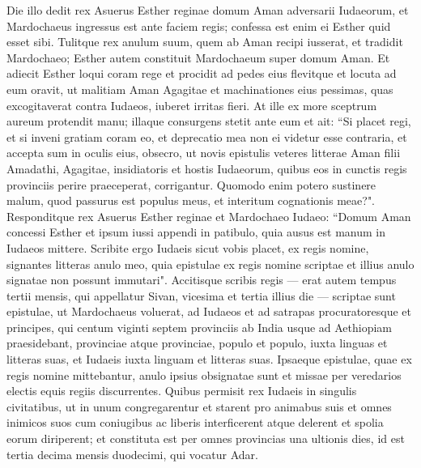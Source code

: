 \begin{biblechapter} 
\verse Die illo dedit rex Asuerus Esther reginae domum Aman adversarii Iudaeorum, et Mardochaeus ingressus est ante faciem regis; confessa est enim ei Esther quid esset sibi. 
\verse Tulitque rex anulum suum, quem ab Aman recipi iusserat, et tradidit Mardochaeo; Esther autem constituit Mardochaeum super domum Aman. 
\verse Et adiecit Esther loqui coram rege et procidit ad pedes eius flevitque et locuta ad eum oravit, ut malitiam Aman Agagitae et machinationes eius pessimas, quas excogitaverat contra Iudaeos, iuberet irritas fieri. 
\verse At ille ex more sceptrum aureum protendit manu; illaque consurgens stetit ante eum 
\verse et ait: “Si placet regi, et si inveni gratiam coram eo, et deprecatio mea non ei videtur esse contraria, et accepta sum in oculis eius, obsecro, ut novis epistulis veteres litterae Aman filii Amadathi, Agagitae, insidiatoris et hostis Iudaeorum, quibus eos in cunctis regis provinciis perire praeceperat, corrigantur. 
\verse Quomodo enim potero sustinere malum, quod passurus est populus meus, et interitum cognationis meae?". 
\verse Responditque rex Asuerus Esther reginae et Mardochaeo Iudaeo: “Domum Aman concessi Esther et ipsum iussi appendi in patibulo, quia ausus est manum in Iudaeos mittere. 
\verse Scribite ergo Iudaeis sicut vobis placet, ex regis nomine, signantes litteras anulo meo, quia epistulae ex regis nomine scriptae et illius anulo signatae non possunt immutari". 
\verse Accitisque scribis regis — erat autem tempus tertii mensis, qui appellatur Sivan, vicesima et tertia illius die — scriptae sunt epistulae, ut Mardochaeus voluerat, ad Iudaeos et ad satrapas procuratoresque et principes, qui centum viginti septem provinciis ab India usque ad Aethiopiam praesidebant, provinciae atque provinciae, populo et populo, iuxta linguas et litteras suas, et Iudaeis iuxta linguam et litteras suas. 
\verse Ipsaeque epistulae, quae ex regis nomine mittebantur, anulo ipsius obsignatae sunt et missae per veredarios electis equis regiis discurrentes. 
\verse Quibus permisit rex Iudaeis in singulis civitatibus, ut in unum congregarentur et starent pro animabus suis et omnes inimicos suos cum coniugibus ac liberis interficerent atque delerent et spolia eorum diriperent; 
\verse et constituta est per omnes provincias una ultionis dies, id est tertia decima mensis duodecimi, qui vocatur Adar. 

\end{biblechapter}
